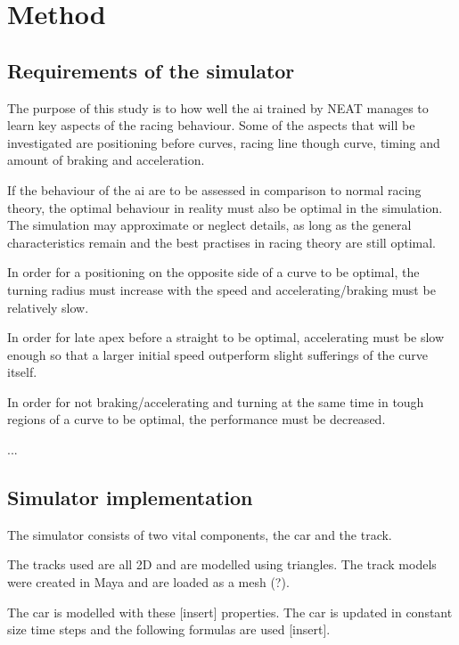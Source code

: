 
\chapter{Method}

\section{Requirements of the simulator}

The purpose of this study is to how well the ai trained by NEAT manages to learn key aspects of the racing behaviour.  Some of the aspects that will be investigated are positioning before curves, racing line though curve, timing and amount of braking and acceleration.

If the behaviour of the ai are to be assessed in comparison to normal racing theory, the optimal behaviour in reality must also be optimal in the simulation. The simulation may approximate or neglect details, as long as the general characteristics remain and the best practises in racing theory are still optimal.

In order for a positioning on the opposite side of a curve to be optimal, the turning radius must increase with the speed and accelerating/braking must be relatively slow.

In order for late apex before a straight to be optimal, accelerating must be slow enough so that a larger initial speed outperform slight sufferings of the curve itself.

In order for not braking/accelerating and turning at the same time in tough regions of a curve to be optimal, the performance must be decreased.

...


\section{Simulator implementation}

The simulator consists of two vital components, the car and the track.

The tracks used are all 2D and are modelled using triangles. The track models were created in Maya and are loaded as a mesh (?).

The car is modelled with these [insert] properties. The car is updated in constant size time steps and the following formulas are used [insert].

